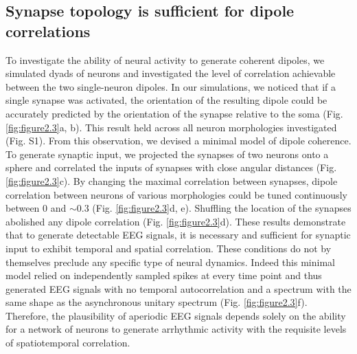 \subsection{Synapse topology is sufficient for dipole correlations}
To investigate the ability of neural activity to generate coherent dipoles, we simulated dyads of neurons and investigated the level of correlation achievable between the two single-neuron dipoles. In our simulations, we noticed that if a single synapse was activated, the orientation of the resulting dipole could be accurately predicted by the orientation of the synapse relative to the soma (Fig. \ref{fig:figure2.3}a, b). This result held across all neuron morphologies investigated (Fig. S1). From this observation, we devised a minimal model of dipole coherence. To generate synaptic input, we projected the synapses of two neurons onto a sphere and correlated the inputs of synapses with close angular distances (Fig. \ref{fig:figure2.3}c). By changing the maximal correlation between synapses, dipole correlation between neurons of various morphologies could be tuned continuously between 0 and ${\sim}0.3$ (Fig. \ref{fig:figure2.3}d, e). Shuffling the location of the synapses abolished any dipole correlation (Fig. \ref{fig:figure2.3}d). These results demonstrate that to generate detectable EEG signals, it is necessary and sufficient for synaptic input to exhibit temporal and spatial correlation. These conditions do not by themselves preclude any specific type of neural dynamics. Indeed this minimal model relied on independently sampled spikes at every time point and thus generated EEG signals with no temporal autocorrelation and a spectrum with the same shape as the asynchronous unitary spectrum (Fig. \ref{fig:figure2.3}f). Therefore, the plausibility of aperiodic EEG signals depends solely on the ability for a network of neurons to generate arrhythmic activity with the requisite levels of spatiotemporal correlation. 

